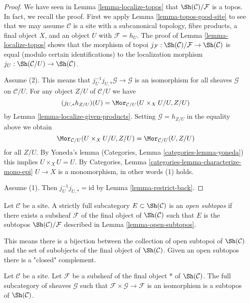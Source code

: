 \begin{proof}
We have seen in Lemma \ref{lemma-localize-topos} that
$\Sh(\mathcal{C})/\mathcal{F}$ is a topos. In fact, we recall the
proof. First we apply Lemma \ref{lemma-topos-good-site}
to see that we may assume $\mathcal{C}$ is a site with a subcanonical
topology, fibre products, a final object $X$, and an object $U$ with
$\mathcal{F} = h_U$. The proof of
Lemma \ref{lemma-localize-topos}
shows that the morphism of topoi
$j_\mathcal{F} : \Sh(\mathcal{C})/\mathcal{F} \to \Sh(\mathcal{C})$
is equal (modulo certain identifications) to the localization morphism
$j_U : \Sh(\mathcal{C}/U) \to \Sh(\mathcal{C})$.

\medskip\noindent
Assume (2). This means that $j_U^{-1}j_{U, *}\mathcal{G} \to \mathcal{G}$
is an isomorphism for all sheaves $\mathcal{G}$ on $\mathcal{C}/U$.
For any object $Z/U$ of $\mathcal{C}/U$ we have
$$
(j_{U, *}h_{Z/U})(U) = \Mor_{\mathcal{C}/U}(U \times_X U/U, Z/U)
$$
by Lemma \ref{lemma-localize-given-products}.
Setting $\mathcal{G} = h_{Z/U}$ in the equality above we obtain
$$
\Mor_{\mathcal{C}/U}(U \times_X U/U, Z/U) = \Mor_{\mathcal{C}/U}(U, Z/U)
$$
for all $Z/U$. By Yoneda's lemma
(Categories, Lemma \ref{categories-lemma-yoneda})
this implies $U \times_X U = U$. By
Categories, Lemma \ref{categories-lemma-characterize-mono-epi}
$U \to X$ is a monomorphism, in other words (1) holds.

\medskip\noindent
Assume (1). Then $j_U^{-1} j_{U, *} = \text{id}$ by
Lemma \ref{lemma-restrict-back}.
\end{proof}

\begin{definition}
\label{definition-open-subtopos}
Let $\mathcal{C}$ be a site. A strictly full subcategory
$E \subset \Sh(\mathcal{C})$ is an {\it open subtopos}
if there exists a subsheaf $\mathcal{F}$ of the final object
of $\Sh(\mathcal{C})$ such that $E$ is the subtopos
$\Sh(\mathcal{C})/\mathcal{F}$ described in Lemma \ref{lemma-open-subtopos}.
\end{definition}

\noindent
This means there is a bijection between the collection of open subtopoi
of $\Sh(\mathcal{C})$ and the set of subobjects of the final object of
$\Sh(\mathcal{C})$. Given an open subtopos there is a "closed" complement.

\begin{lemma}
\label{lemma-closed-subtopos}
Let $\mathcal{C}$ be a site. Let $\mathcal{F}$ be a subsheaf of the final
object $*$ of $\Sh(\mathcal{C})$. The full subcategory of sheaves
$\mathcal{G}$ such that $\mathcal{F} \times \mathcal{G} \to \mathcal{F}$
is an isomorphism is a subtopos of $\Sh(\mathcal{C})$.
\end{lemma}

